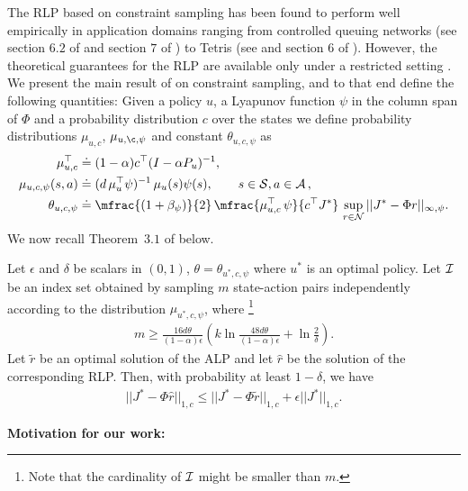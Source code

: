 The RLP based on constraint sampling has been found to perform well empirically in application domains ranging from controlled queuing networks (see section $6.2$ of \cite{ALP} and section $7$ of \cite{SALP}) to Tetris (see \cite{CST} and section $6$ of \cite{SALP}). However, the theoretical guarantees for the RLP are available only under a restricted setting \cite{CS}. We present the main result of \cite{CS} on constraint sampling, and to that end define the following quantities:
Given a policy $u$, a Lyapunov function $\psi$ in the column span of $\Phi$
and a probability distribution $c$ over the states
we define probability distributions $\mu_{u,c}$, $\mu_{u,\c,\psi}$ and constant $\theta_{u,c,\psi}$ as 
\begin{align}
\mu_{u,c}^\top& \eqdef (1-\alpha)c^\top (I-\alpha P_u)^{-1},\nn\\
\mu_{u,c,\psi}(s,a)&\eqdef (d \, \mu_u^\top \psi)^{-1} \, \mu_{u}(s) \psi(s),\nn\qquad s\in \S,a\in  \A\,,\\
\theta_{u,c,\psi} &\eqdef\mfrac{(1+\beta_{\psi})}{2} \, \mfrac{\mu_{u,c}^\top \,\psi}{c^\top J^*}\, \sup_{r\in \N}||J^*-\Phi r||_{\mn}.
\end{align}
We now recall Theorem~$3.1$ of \cite{CS} below. 
\begin{theorem}\label{csresult}
Let $\epsilon$ and $\delta$ be scalars in $(0,1)$,
$\theta = \theta_{u^*,c,\psi}$ where $u^*$ is an optimal policy.
Let $\mathcal{I}$ be an index set obtained by sampling $m$ state-action pairs 
	independently according to the distribution $\mu_{u^*,c,\psi}$,
	where%
	\footnote{Note that the cardinality of $\mathcal{I}$ might be smaller than $m$.}
\begin{align}
m\geq \frac{16d\theta}{(1-\alpha)\epsilon}\left(k\ln\frac{48d\theta}{(1-\alpha)\epsilon}+\ln\frac{2}{\delta}\right).
\end{align}
Let $\tilde{r}$ be an optimal	solution of the ALP and let $\hat{r}$ be the solution of the corresponding RLP. 
Then, with probability at least $1-\delta$, we have
\begin{align}
||J^*-\Phi \hat{r}||_{1,c}\leq ||J^*-\Phi \tilde{r}||_{1,c}+\epsilon||J^*||_{1,c}.
\end{align}
\end{theorem}
\noindent \textbf{Motivation for our work:}
